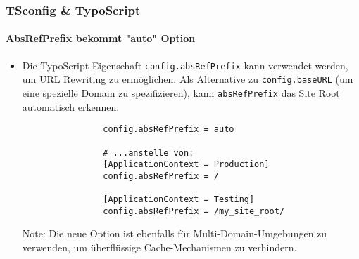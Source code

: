 \begin{frame}[fragile]
	\frametitle{TSconfig \& TypoScript}
	\framesubtitle{AbsRefPrefix bekommt "auto" Option}

	\begin{itemize}
		\item Die TypoScript Eigenschaft \texttt{config.absRefPrefix} kann verwendet werden, um URL
			Rewriting zu ermöglichen. Als Alternative zu \texttt{config.baseURL} (um eine spezielle Domain zu spezifizieren), kann \texttt{absRefPrefix} das Site Root automatisch erkennen:

			\begin{lstlisting}
				config.absRefPrefix = auto

				# ...anstelle von:
				[ApplicationContext = Production]
				config.absRefPrefix = /

				[ApplicationContext = Testing]
				config.absRefPrefix = /my_site_root/
			\end{lstlisting}

		\smaller
			Note: Die neue Option ist ebenfalls für Multi-Domain-Umgebungen zu verwenden, um überflüssige Cache-Mechanismen zu verhindern.
		\normalsize

	\end{itemize}

\end{frame}


